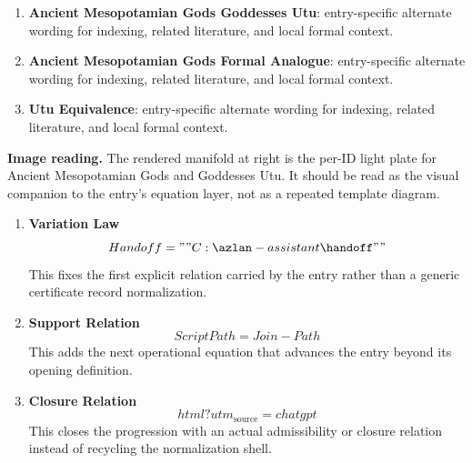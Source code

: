 \begin{enumerate}[leftmargin=1.6em,itemsep=6pt,topsep=4pt]
\item \textbf{Ancient Mesopotamian Gods Goddesses Utu}: entry-specific alternate wording for indexing, related literature, and local formal context.
\item \textbf{Ancient Mesopotamian Gods Formal Analogue}: entry-specific alternate wording for indexing, related literature, and local formal context.
\item \textbf{Utu Equivalence}: entry-specific alternate wording for indexing, related literature, and local formal context.
\end{enumerate}

\begin{samepage}
\noindent\begin{minipage}[t]{0.45\linewidth}
\vspace{0pt}
\raggedright
\scriptsize\textbf{Image reading.} The rendered manifold at right is the per-ID light plate for Ancient Mesopotamian Gods and Goddesses Utu. It should be read as the visual companion to the entry's equation layer, not as a repeated template diagram.\par
\end{minipage}\hfill
\begin{minipage}[t]{0.53\linewidth}
\vspace*{-0.10in}
\raggedright
{}
\end{minipage}
\end{samepage}

\clearpage


\begin{enumerate}[leftmargin=1.6em,itemsep=9pt,topsep=6pt]
\item \textbf{Variation Law}
\[
Handoff = ""C:\azlan-assistant\handoff""
\]
This fixes the first explicit relation carried by the entry rather than a generic certificate record normalization.

\item \textbf{Support Relation}
\[
ScriptPath = Join-Path
\]
This adds the next operational equation that advances the entry beyond its opening definition.

\item \textbf{Closure Relation}
\[
html?utm_{\mathrm{source}}=chatgpt
\]
This closes the progression with an actual admissibility or closure relation instead of recycling the normalization shell.
\end{enumerate}


